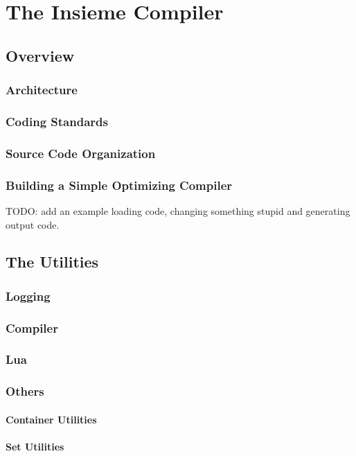 \chapter{The Insieme Compiler} \label{cap:compiler}

\section{Overview}
\subsection{Architecture}
\subsection{Coding Standards}
\subsection{Source Code Organization}
\subsection{Building a Simple Optimizing Compiler}
\label{cap:compiler:sec:overview:sub:building} TODO: add an example loading
code, changing something stupid and generating output code.

\section{The Utilities}
\subsection{Logging}
\subsection{Compiler}
\subsection{Lua}
\subsection{Others}
\subsubsection{Container Utilities}
\subsubsection{Set Utilities}
